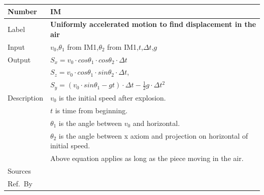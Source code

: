 \documentclass[12pt]{article}
\newcommand{\colAwidth}{0.13\textwidth}
\newcommand{\colBwidth}{0.82\textwidth}
\newcounter{instnum} %
\begin{document}
	\noindent
	\begin{minipage}{\textwidth}
		\renewcommand*{\arraystretch}{1.5}
		\begin{tabular}{| p{\colAwidth} | p{\colBwidth}|}
			\hline
			\rowcolor[gray]{0.9}
			Number& IM{instnum}\theinstnum \label{IM_DIA}\\
			\hline
			Label& \bf Uniformly accelerated motion to find displacement in the air\\
			\hline
			Input&$v_{0}$,$\theta_{1}$ from IM1,$\theta_{2}$ from IM1,$t$,$\Delta t$,$g$\\
			\hline
			Output&$S_{x}=v_{0}\cdot cos\theta _{1}\cdot cos\theta _{2}\cdot \Delta t$\\
			&$S_{z}=v_{0}\cdot cos\theta _{1}\cdot sin\theta _{2}\cdot \Delta t$,\\
			&$S_{y}=(v_{0}\cdot sin\theta _{1} - gt)\cdot \Delta t-\frac{1}{2}g \cdot \Delta t^{2}$\\
			\hline
			Description&$v_{0}$ is the initial speed after explosion.\\
			&$t$ is time from beginning.\\
			&$\theta _{1}$ is the angle between $v_{0}$ and horizontal.\\
			&$\theta _{2}$ is the angle between x axiom and projection on horizontal of initial speed.\\
			& Above equation applies as long as the piece moving in the air.
			\\
			\hline
			Sources&~\ \ \\
			\hline
			Ref.\ By & \\
			\hline
		\end{tabular}
	\end{minipage}\\
	
	~\newline
	
\end{document}
